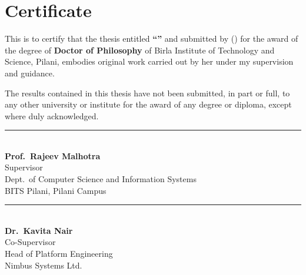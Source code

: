 \chapter*{Certificate}

\vspace{0.4cm}
\noindent This is to certify that the thesis entitled \textbf{``\thesistitle''} and submitted by \textbf{\candidatename} (\candidateid) for the award of the degree of \textbf{Doctor of Philosophy} of Birla Institute of Technology and Science, Pilani, embodies original work carried out by her under my supervision and guidance.

\vspace{0.5cm}
\noindent The results contained in this thesis have not been submitted, in part or full, to any other university or institute for the award of any degree or diploma, except where duly acknowledged.

\vspace{1.6cm}
\noindent
\begin{minipage}[t]{0.45\textwidth}
\vspace{0pt}
{\color{bitsgray}\rule{5cm}{0.5pt}}\\[4pt]
\textbf{Prof.\ Rajeev Malhotra}\\
Supervisor\\
Dept.\ of Computer Science and Information Systems\\
BITS Pilani, Pilani Campus
\end{minipage}\hfill
\begin{minipage}[t]{0.45\textwidth}
\vspace{0pt}
{\color{bitsgray}\rule{5cm}{0.5pt}}\\[4pt]
\textbf{Dr.\ Kavita Nair}\\
Co-Supervisor\\
Head of Platform Engineering\\
Nimbus Systems Ltd.
\end{minipage}

\vspace{1.0cm}

